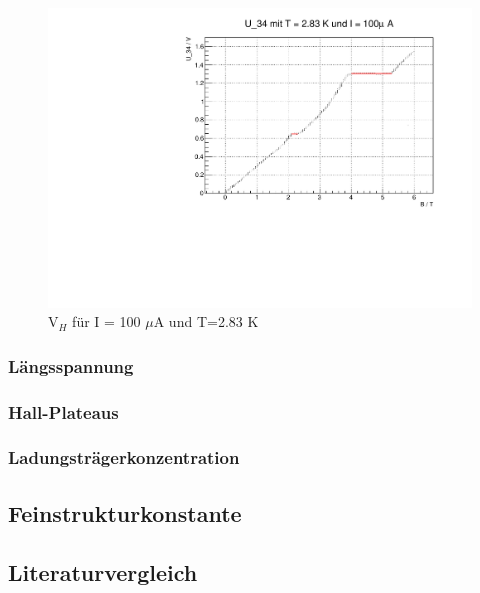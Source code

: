 \begin{figure}
\label{}
\centering
\includegraphics[scale = 0.5]{../plots/U_34_100muA_2830mK.pdf}
\caption{$\text{V}_H$ für I = 100 $\mu$A und T=2.83 K}
\end{figure}


\FloatBarrier


\subsubsection{Längsspannung}

\subsubsection{Hall-Plateaus}

\subsubsection{Ladungsträgerkonzentration}

\subsection{Feinstrukturkonstante}

\subsection{Literaturvergleich}
